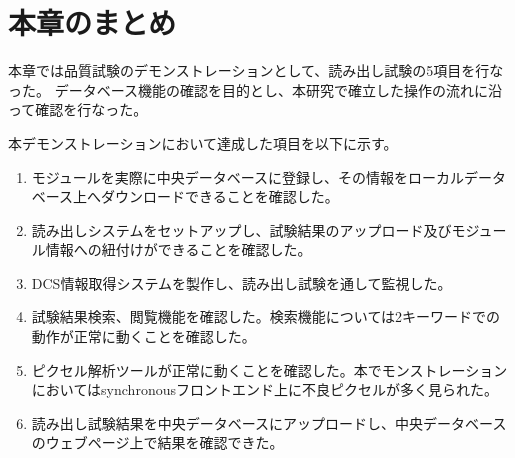 \section{本章のまとめ}
本章では品質試験のデモンストレーションとして、読み出し試験の5項目を行なった。
データベース機能の確認を目的とし、本研究で確立した操作の流れに沿って確認を行なった。

本デモンストレーションにおいて達成した項目を以下に示す。
\begin{enumerate}
  \item モジュールを実際に中央データベースに登録し、その情報をローカルデータベース上へダウンロードできることを確認した。
  \item 読み出しシステムをセットアップし、試験結果のアップロード及びモジュール情報への紐付けができることを確認した。
  \item DCS情報取得システムを製作し、読み出し試験を通して監視した。
  \item 試験結果検索、閲覧機能を確認した。検索機能については2キーワードでの動作が正常に動くことを確認した。
  \item ピクセル解析ツールが正常に動くことを確認した。本でモンストレーションにおいてはsynchronousフロントエンド上に不良ピクセルが多く見られた。
  \item 読み出し試験結果を中央データベースにアップロードし、中央データベースのウェブページ上で結果を確認できた。
\end{enumerate}

